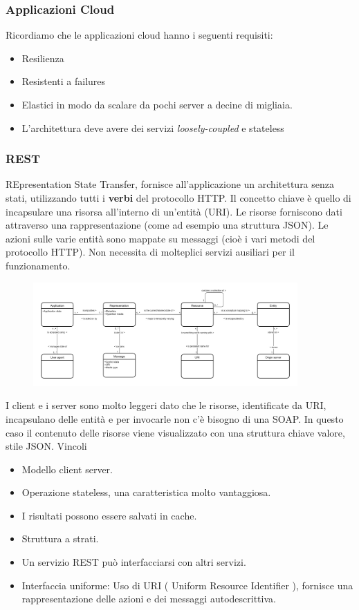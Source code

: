 \documentclass{article}
\begin{document}
		\subsubsection{Applicazioni Cloud}
		Ricordiamo che le applicazioni cloud hanno i seguenti requisiti:
		\begin{itemize}
		    \item Resilienza
		    \item Resistenti a failures
		    \item Elastici in modo da scalare da pochi server a decine di migliaia.
		    \item L'architettura deve avere dei servizi \textit{loosely-coupled} e stateless
		\end{itemize}
		
		\subsubsection{REST}
		REpresentation State Transfer, fornisce all'applicazione un architettura senza stati, utilizzando tutti i \textbf{verbi} del protocollo HTTP.
		Il concetto chiave è quello di incapsulare una risorsa all'interno di un'entità (URI). Le risorse forniscono dati attraverso una rappresentazione (come ad esempio una struttura JSON). Le azioni sulle varie entità sono mappate su messaggi (cioè i vari metodi del protocollo HTTP). Non necessita di molteplici servizi ausiliari per il funzionamento.
		
		\begin{figure}[ht]
		\centering
		\includegraphics[width=0.9\textwidth]{SAC_08.png}
		\end{figure}

		I client e i server sono molto leggeri dato che le risorse, identificate da URI, incapsulano delle entità e per invocarle non c'è bisogno di una SOAP. In questo caso il contenuto delle risorse viene visualizzato con una struttura chiave valore, stile JSON.
		Vincoli
		
		\begin{itemize}
		    \item Modello client server.
		    \item Operazione stateless, una caratteristica molto vantaggiosa.
		    \item I risultati possono essere salvati in cache.
		    \item Struttura a strati. 
		    \item Un servizio REST può interfacciarsi con altri servizi. 
		    \item Interfaccia uniforme: Uso di URI ( Uniform Resource Identifier ), fornisce una rappresentazione delle azioni e dei messaggi autodescrittiva. 
		\end{itemize}
		
\end{document}

